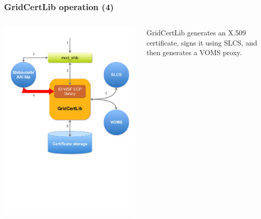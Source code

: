 \documentclass{beamer}
\newcommand{\+}{\vspace{1em}}
\begin{document}
\begin{frame}
  \frametitle{GridCertLib operation (4)}
  \begin{columns}
    \begin{column}{0.5\textwidth}
    \includegraphics[width=\linewidth,viewport=0 300 600 650]{architecture4}
    \end{column}
    \begin{column}{0.5\textwidth}
      \begin{center}
        GridCertLib generates an X.509 certificate, signs it using
        SLCS, and then generates a VOMS proxy.
      \end{center}
    \end{column}
  \end{columns}
\end{frame}
\end{document}
